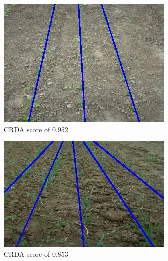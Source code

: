 \begin{figure}[H]
\centering
\begin{subfigure}{0.49\textwidth}
    \includegraphics[width=\textwidth]{Report/images/ransac001.jpg}
    \caption{CRDA score of 0.952}
    \label{fig:first}
\end{subfigure}
\begin{subfigure}{0.49\textwidth}%
    \includegraphics[width=\textwidth]{Report/images/ransac002.jpg}
    \caption{CRDA score of 0.853}
    \label{fig:second}
\end{subfigure}
\begin{subfigure}{0.49\textwidth}%

\end{subfigure}
\end{figure}
